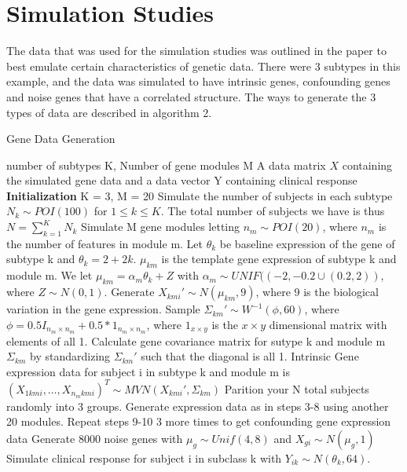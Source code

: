 \documentclass{statsoc}
\begin{document}
\section{Simulation Studies}

The data that was used for the simulation studies was outlined in the paper to best emulate certain characteristics of genetic data. There were 3 subtypes in this example, and the data was simulated to have intrinsic genes, confounding genes and noise genes that have a correlated structure. The ways to generate the 3 types of data are described in algorithm 2. 

\begin{algorithm}
    \caption{Gene Data Generation}
    \begin{algorithmic}[1]
        \INPUT number of subtypes K, Number of gene modules M
        \OUTPUT A data matrix $X$ containing the simulated gene data and a data vector Y containing clinical response
        \STATE \textbf{Initialization} K = 3, M = 20
        \STATE Simulate the number of subjects in each subtype $N_k \sim POI(100)$ for $1 \leq k \leq K$. The total number of subjects we have is thus $N = \sum_{k=1}^K N_k$
        \STATE Simulate M gene modules letting $n_m \sim POI(20)$, where $n_m$ is the number of features in module m.
        \STATE Let $\theta_k$ be baseline expression of the gene of subtype k and $\theta_k = 2 + 2k$. $\mu_{km}$ is the template gene expression of subtype k and module m. We let $\mu_{km} = \alpha_m\theta_k + Z$ with $\alpha_m \sim UNIF((-2,-0.2 \cup (0.2,2))$, where $Z \sim N(0,1)$.
        \STATE Generate $X_{kmi}' \sim N(\mu_{km}, 9)$, where 9 is the biological variation in the gene expression. 
        \STATE Sample $\Sigma_{km}' \sim W^{-1}(\phi, 60)$, where $\phi = 0.5 I_{n_m \times n_m} + 0.5*1_{n_m\times n_m}$, where $1_{x\times y}$ is the $x\times y$ dimensional matrix with elements of all 1.
        \STATE Calculate gene covariance matrix for sutype k and module m $\Sigma_{km}$ by standardizing $\Sigma_{km}'$ such that the diagonal is all 1.
        \STATE Intrinsic Gene expression data for subject i in subtype k and module m is $(X_{1kmi}, \ldots, X_{n_mkmi})^T \sim MVN(X_{kmi}', \Sigma_{km})$
        \STATE Parition your N total subjects randomly into 3 groups.
        \STATE Generate expression data as in steps 3-8 using another 20 modules.
        \STATE Repeat steps 9-10 3 more times to get confounding gene expression data
        \STATE Generate 8000 noise genes with $\mu_g \sim Unif(4,8)$ and $X_{gi} \sim N(\mu_g, 1)$
        \STATE Simulate clinical response for subject i in subclass k with $Y_{ik} \sim N(\theta_k, 64)$.
    \end{algorithmic}
\end{algorithm}
\end{document}
